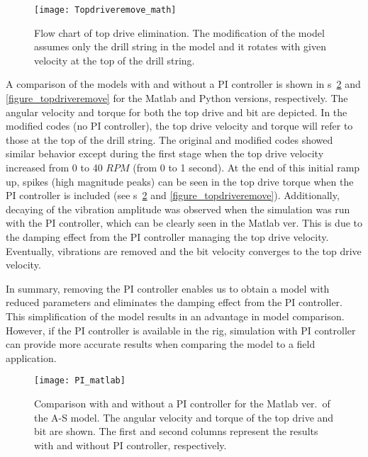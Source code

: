 \begin{figure}
	\centering
	\texttt{[image: Topdriveremove\_math]}
    \caption[Flow chart of top drive elimination]{Flow chart of top drive elimination. The modification of the model assumes only the drill string in the model and it rotates with given velocity at the top of the drill string.}
	\label{figure_Topdriveremove_math}
\end{figure}

A comparison of the models with and without a PI controller is shown in \figurename{}s~\ref{figure_topdriveremove_Matlab} and \ref{figure_topdriveremove} for the Matlab and Python versions, respectively. The angular velocity and torque for both the top drive and bit are depicted. In the modified codes (no PI controller), the top drive velocity and torque will refer to those at the top of the drill string. The original and modified codes showed similar behavior except during the first stage when the top drive velocity increased from 0 to 40 $RPM$ (from 0 to 1 second). At the end of this initial ramp up, spikes (high magnitude peaks) can be seen in the top drive torque when the PI controller is included (see \figurename{}s~\ref{figure_topdriveremove_Matlab} and \ref{figure_topdriveremove}). Additionally, decaying of the vibration amplitude was observed when the simulation was run with the PI controller, which can be clearly seen in the Matlab ver. This is due to the damping effect from the PI controller managing the top drive velocity. Eventually, vibrations are removed and the bit velocity converges to the top drive velocity.

In summary, removing the PI controller enables us to obtain a model with reduced parameters and eliminates the damping effect from the PI controller. This simplification of the model results in an advantage in model comparison. However, if the PI controller is available in the rig, simulation with PI controller can provide more accurate results when comparing the model to a field application.
\begin{figure}
  \centering
  \texttt{[image: PI\_matlab]}
  \caption[Comparison with and without a PI controller for the Matlab ver.\ of the A-S model]{Comparison with and without a PI controller for the Matlab ver.\ of the A-S model. The angular velocity and torque of the top drive and bit are shown. The first and second columns represent the results with and without PI controller, respectively.}
  \label{figure_topdriveremove_Matlab}
\end{figure}

